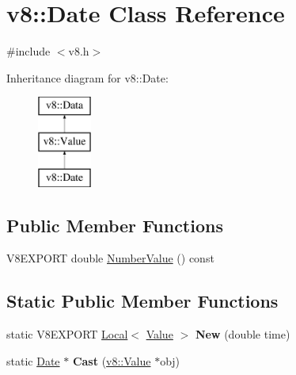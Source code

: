 \hypertarget{classv8_1_1_date}{}\section{v8\+:\+:Date Class Reference}
\label{classv8_1_1_date}


{\ttfamily \#include $<$v8.\+h$>$}

Inheritance diagram for v8\+:\+:Date\+:\begin{figure}[H]
\begin{center}
\leavevmode
\includegraphics[height=3.000000cm]{classv8_1_1_date}
\end{center}
\end{figure}
\subsection*{Public Member Functions}
\begin{DoxyCompactItemize}
\item 
V8\+E\+X\+P\+O\+R\+T double \hyperlink{classv8_1_1_date_ae9ccdc971d9738631ed2f28ef42d8a8c}{Number\+Value} () const 
\end{DoxyCompactItemize}
\subsection*{Static Public Member Functions}
\begin{DoxyCompactItemize}
\item 
\hypertarget{classv8_1_1_date_a00a33c616710d92dae77440182cc30b2}{}static V8\+E\+X\+P\+O\+R\+T \hyperlink{classv8_1_1_local}{Local}$<$ \hyperlink{classv8_1_1_value}{Value} $>$ {\bfseries New} (double time)\label{classv8_1_1_date_a00a33c616710d92dae77440182cc30b2}

\item 
\hypertarget{classv8_1_1_date_a8e5ea7c1f28924b82922270d6596b4d3}{}static \hyperlink{classv8_1_1_date}{Date} $\ast$ {\bfseries Cast} (\hyperlink{classv8_1_1_value}{v8\+::\+Value} $\ast$obj)\label{classv8_1_1_date_a8e5ea7c1f28924b82922270d6596b4d3}

\end{DoxyCompactItemize}


